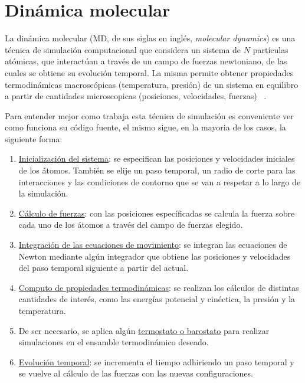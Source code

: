 \section{Dinámica molecular}

La dinámica molecular (MD, de sus siglas en inglés, \textit{molecular dynamics})
es una técnica de simulación computacional que considera un sistema de $N$
partículas atómicas, que interactúan a través de un campo de fuerzas newtoniano,
de las cuales se obtiene su evolución temporal. La misma permite obtener
propiedades termodinámicas macroscópicas (temperatura, presión) de un sistema en 
equilibro a partir de cantidades microscopicas (posiciones, velocidades, fuerzas)
~\cite{frenkel2001, allen2017}.

Para entender mejor como trabaja esta técnica de simulación es conveniente ver
como funciona su código fuente, el mismo sigue, en la mayoria de los casos, la
siguiente forma:
\begin{enumerate}
    \item \underline{Inicialización del sistema}: se especifican las posiciones y
        velocidades iniciales de los átomos. También se elije un paso temporal, 
        un radio de corte para las interacciones y las condiciones de contorno que
        se van a respetar a lo largo de la simulación. 
    \item \underline{Cálculo de fuerzas}: con las posiciones específicadas se
        calcula la fuerza sobre cada uno de los átomos a través del campo de 
        fuerzas elegido.
    \item \underline{Integración de las ecuaciones de movimiento}: se integran las
        ecuaciones de Newton mediante algún integrador que obtiene las posiciones
        y velocidades del paso temporal siguiente a partir del actual.
    \item \underline{Computo de propiedades termodinámicas}: se realizan los
        cálculos de distintas cantidades de interés, como las energías potencial
        y cinéctica, la presión y la temperatura.
    \item De ser necesario, se aplica algún \underline{termostato o barostato}
        para realizar simulaciones en el ensamble termodinámico deseado.
    \item \underline{Evolución temporal}: se incrementa el tiempo adhiriendo un
        paso temporal y se vuelve al cálculo de las fuerzas con las nuevas 
        configuraciones.
\end{enumerate}

